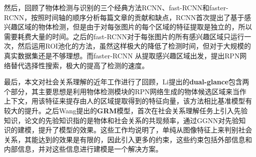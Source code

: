 然后，回顾了物体检测与识别的三个经典方法RCNN、fast-RCNN和faster-RCNN，按照时间轴的顺序分析每篇文章的贡献和缺点，RCNN首次提出了基于感兴趣区域的物体检测，但是由于对每张图片的每个区域的特征提取是独立的，所以需要耗费大量的时间。之后的fast-RCNN对于每张图片的所有感兴趣区域只运行一次，然后运用ROI池化的方法，虽然这样极大的降低了检测时间，但对于大规模的真实数据集还是不够理想。而faster-RCNN 从提取感兴趣区域出发，提出RPN网络替代选择性搜索，极大的提高了检测的速度。

最后，本文对社会关系理解的近年工作进行了回顾，Li提出的\textbf{dual-glance}包含两个部分，其主要思想是利用物体检测模块的RPN网络生成的物体候选区域来当作上下文，用该特征来提存由人的区域提取得到的特征向量，该方法相比基准模型有较大的提升。之后Wang提出的\textbf{GRM}模型，首次在社会关系理解任务上引入先验知识，论文的先验知识指的是物体和社会关系的共现频率，通过GGNN对先验知识的建模，提升了模型的效果。这些工作均说明了，单纯从图像特征上来判别社会关系，其能达到的效果是有限的，因此引入更多的约束，这些约束包括外部信息和内部信息，并对这些信息进行建模是一个解决方案。







